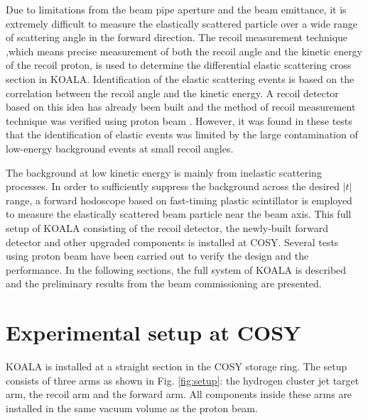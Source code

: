 \documentclass[number,5p]{elsarticle}
\begin{document}
Due to limitations from the beam pipe aperture and the beam emittance,
it is extremely difficult to measure the elastically scattered particle over a wide range of scattering angle in the forward direction.
The recoil measurement technique ,which means precise measurement of both the recoil angle and the kinetic energy of the recoil proton, 
is used to determine the differential elastic scattering cross section in KOALA.
Identification of the elastic scattering events is based on the correlation between the recoil angle and the kinetic energy.
A recoil detector based on this idea has already been built and the method of
recoil measurement technique was verified using proton beam
\cite{recoil_article,koala_article}.
However, it was found in these tests that the identification of elastic events was limited by the large contamination of low-energy
background events at small recoil angles.

The background at low kinetic energy is mainly from inelastic scattering processes.
In order to sufficiently suppress the background across the desired $|t|$ range,
a forward hodoscope based on fast-timing plastic scintillator is
employed to measure the elastically scattered beam particle near the beam axis.
This full setup of KOALA consisting of the recoil detector, the newly-built forward detector and other upgraded components is installed at COSY.
Several tests using proton beam have been carried out to verify the design and the performance.
In the following sections,  the full system of KOALA is described and the preliminary results from the beam commissioning are presented.

\section{Experimental setup at COSY}
\label{sec:setup}

KOALA is installed at a straight section in the COSY storage ring.
The setup consists of three arms as shown in Fig. \ref{fig:setup}: the hydrogen
cluster jet target arm, the recoil arm and the forward arm.
All components inside these arms are installed in the same vacuum volume as the
proton beam.
\end{document}
